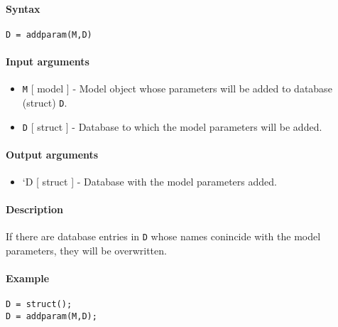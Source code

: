 


	\paragraph{Syntax}\label{syntax}

\begin{verbatim}
D = addparam(M,D)
\end{verbatim}

\paragraph{Input arguments}\label{input-arguments}

\begin{itemize}
\item
  \texttt{M} {[} model {]} - Model object whose parameters will be added
  to database (struct) \texttt{D}.
\item
  \texttt{D} {[} struct {]} - Database to which the model parameters
  will be added.
\end{itemize}

\paragraph{Output arguments}\label{output-arguments}

\begin{itemize}
\itemsep1pt\parskip0pt
\item
  `D {[} struct {]} - Database with the model parameters added.
\end{itemize}

\paragraph{Description}\label{description}

If there are database entries in \texttt{D} whose names conincide with
the model parameters, they will be overwritten.

\paragraph{Example}\label{example}

\begin{verbatim}
D = struct();
D = addparam(M,D);
\end{verbatim}


